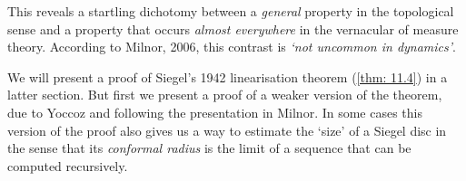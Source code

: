 \documentclass[../main.tex]{subfiles}
\begin{document}
This reveals a startling dichotomy between a \textit{general} property in the topological sense and a property that occurs \textit{almost everywhere} in the vernacular of measure theory. According to Milnor, 2006, this contrast is \emph{`not uncommon in dynamics'}.

We will present a proof of Siegel's 1942 linearisation theorem (\ref{thm: 11.4}) in a latter section. But first we present a proof of a weaker version of the theorem, due to Yoccoz and following the presentation in Milnor. In some cases this version of the proof also gives us a way to estimate the `size' of a Siegel disc in the sense that its \emph{conformal radius} is the limit of a sequence that can be computed recursively.
\end{document}

